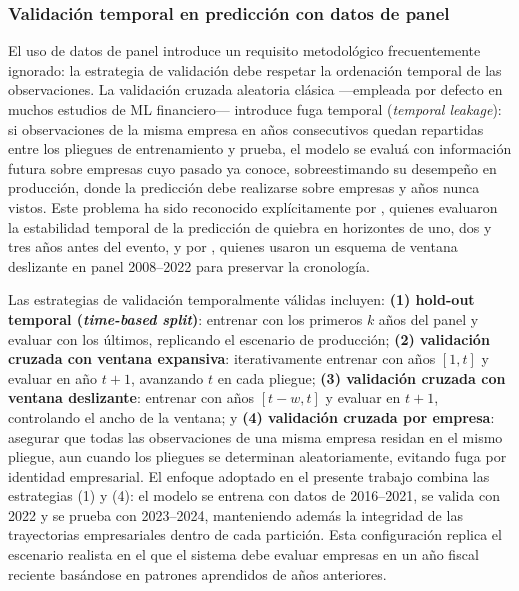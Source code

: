\documentclass[12pt, letterpaper]{article}
\begin{document}
\subsubsection{Validaci\'on temporal en predicci\'on con datos de panel}
\label{sec:validacion-temporal}

El uso de datos de panel introduce un requisito metodol\'ogico frecuentemente ignorado: la estrategia de validaci\'on debe respetar la ordenaci\'on temporal de las observaciones. La validaci\'on cruzada aleatoria cl\'asica ---empleada por defecto en muchos estudios de ML financiero--- introduce fuga temporal (\textit{temporal leakage}): si observaciones de la misma empresa en a\~nos consecutivos quedan repartidas entre los pliegues de entrenamiento y prueba, el modelo se evalu\'a con informaci\'on futura sobre empresas cuyo pasado ya conoce, sobreestimando su desempe\~no en producci\'on, donde la predicci\'on debe realizarse sobre empresas y a\~nos nunca vistos. Este problema ha sido reconocido expl\'icitamente por \citet{Bortolotti2024}, quienes evaluaron la estabilidad temporal de la predicci\'on de quiebra en horizontes de uno, dos y tres a\~nos antes del evento, y por \citet{Mahesh2025}, quienes usaron un esquema de ventana deslizante en panel 2008--2022 para preservar la cronolog\'ia.

Las estrategias de validaci\'on temporalmente v\'alidas incluyen: \textbf{(1) hold-out temporal (\textit{time-based split})}: entrenar con los primeros $k$ a\~nos del panel y evaluar con los \'ultimos, replicando el escenario de producci\'on; \textbf{(2) validaci\'on cruzada con ventana expansiva}: iterativamente entrenar con a\~nos $[1, t]$ y evaluar en a\~no $t+1$, avanzando $t$ en cada pliegue; \textbf{(3) validaci\'on cruzada con ventana deslizante}: entrenar con a\~nos $[t-w, t]$ y evaluar en $t+1$, controlando el ancho de la ventana; y \textbf{(4) validaci\'on cruzada por empresa}: asegurar que todas las observaciones de una misma empresa residan en el mismo pliegue, aun cuando los pliegues se determinan aleatoriamente, evitando fuga por identidad empresarial. El enfoque adoptado en el presente trabajo combina las estrategias (1) y (4): el modelo se entrena con datos de 2016--2021, se valida con 2022 y se prueba con 2023--2024, manteniendo adem\'as la integridad de las trayectorias empresariales dentro de cada partici\'on. Esta configuraci\'on replica el escenario realista en el que el sistema debe evaluar empresas en un a\~no fiscal reciente bas\'andose en patrones aprendidos de a\~nos anteriores.
\end{document}
